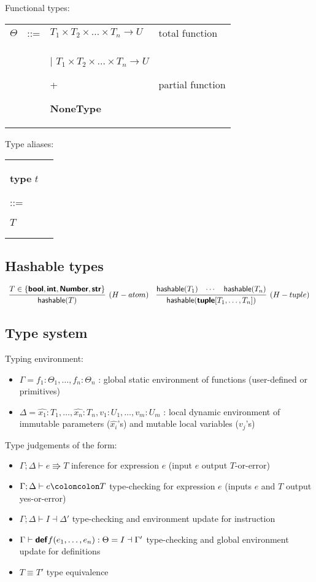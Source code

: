 \documentclass[a4paper]{article}
\newcommand{\kw}[1]{\textsf{\textbf{#1}}}
\newcommand{\code}[1]{\begin{sffamily}#1\end{sffamily}}
\newcommand{\colcol}{\coloncolon}
\newcommand{\yield}{\Rrightarrow}
\newcommand{\fun}[1]{\mathsf{#1}}
\begin{document}
Functional types:

\begin{tabular}{llll}
$\Theta$ & ::= & $T_1 \times T_2 \times \ldots \times T_n \rightarrow U$ & total function \\
  & & | $T_1 \times T_2 \times \ldots \times T_n \rightarrow U$ \code{+} \kw{NoneType} & partial function \\
\end{tabular}

Type aliases:

\begin{tabular}{ll}
\kw{type} $t$ \code{::=} $T$
\end{tabular}

\subsection{Hashable types}


$$\begin{array}{cc}
\infer[(H-atom)]{\fun{hashable}(T)}{T \in \{\kw{bool},\kw{int},\kw{Number},\kw{str}\}}
&
\infer[(H-tuple)]{\fun{hashable}(\kw{tuple}[T_1,\ldots,T_n])}{\fun{hashable}(T_1) & \cdots & \fun{hashable}(T_n)}
\end{array}
$$

\subsection{Type system}

Typing environment:

\begin{itemize}
  \item $\Gamma = f_1:\Theta_1,\ldots,f_n:\Theta_n$ : global static environment of functions (user-defined or primitives)
  \item $\Delta = \widehat{x_1}:T_1,\ldots,\widehat{x_n}:T_n,v_1:U_1,\ldots,v_m:U_m$ : local dynamic environment of immutable parameters ($\widehat{x_i}$'s) and mutable local variables ($v_j$'s)
\end{itemize}

Type judgements of the form:

\begin{itemize}
\item $\Gamma;\Delta \vdash e \yield T$ \quad inference for expression $e$ (input $e$ output $T$-or-error)
\item $\Gamma;\Delta \vdash e \colcol T$ \quad type-checking for expression $e$ (inputs $e$ and $T$ output yes-or-error)
\item $\Gamma;\Delta \vdash I \dashv \Delta'$ \quad type-checking and environment update for instruction
\item $\Gamma \vdash \kw{def} f(e_1,\ldots,e_n) : \Theta = I \dashv \Gamma'$ \quad type-checking and global environment update for definitions
\item $T \equiv T'$ \quad type equivalence
\end{itemize}
\end{document}
